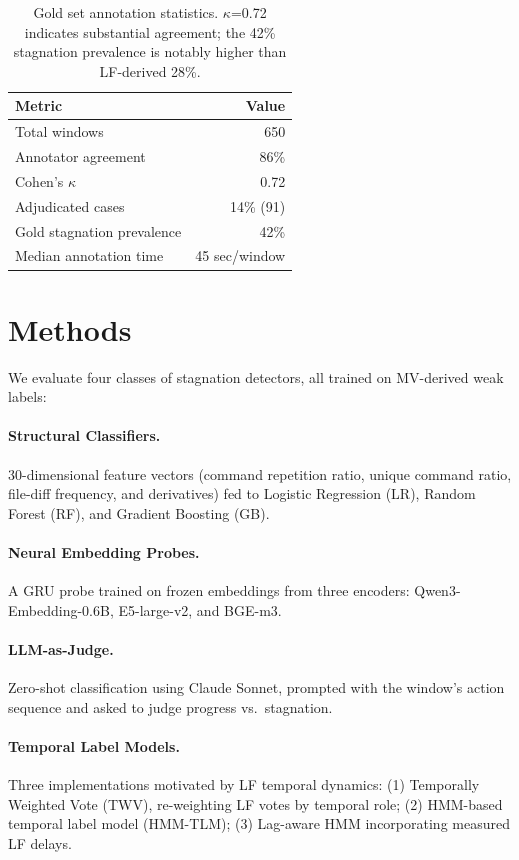 \documentclass[11pt,a4paper]{article}
\begin{document}
\begin{table}[t]
\centering
\small
\begin{tabular}{lr}
\toprule
\textbf{Metric} & \textbf{Value} \\
\midrule
Total windows & 650 \\
Annotator agreement & 86\% \\
Cohen's $\kappa$ & 0.72 \\
Adjudicated cases & 14\% (91) \\
Gold stagnation prevalence & 42\% \\
Median annotation time & 45 sec/window \\
\bottomrule
\end{tabular}
\caption{Gold set annotation statistics. $\kappa$=0.72 indicates substantial agreement; the 42\% stagnation prevalence is notably higher than LF-derived 28\%.}
\label{tab:annotation}
\end{table}

\section{Methods}
\label{sec:methods}

We evaluate four classes of stagnation detectors, all trained on MV-derived weak labels:

\paragraph{Structural Classifiers.}
30-dimensional feature vectors (command repetition ratio, unique command ratio, file-diff frequency, and derivatives) fed to Logistic Regression (LR), Random Forest (RF), and Gradient Boosting (GB).

\paragraph{Neural Embedding Probes.}
A GRU probe trained on frozen embeddings from three encoders: Qwen3-Embedding-0.6B, E5-large-v2, and BGE-m3.

\paragraph{LLM-as-Judge.}
Zero-shot classification using Claude Sonnet, prompted with the window's action sequence and asked to judge progress vs.\ stagnation.

\paragraph{Temporal Label Models.}
Three implementations motivated by LF temporal dynamics: (1) Temporally Weighted Vote (TWV), re-weighting LF votes by temporal role; (2) HMM-based temporal label model (HMM-TLM); (3) Lag-aware HMM incorporating measured LF delays.
\end{document}

